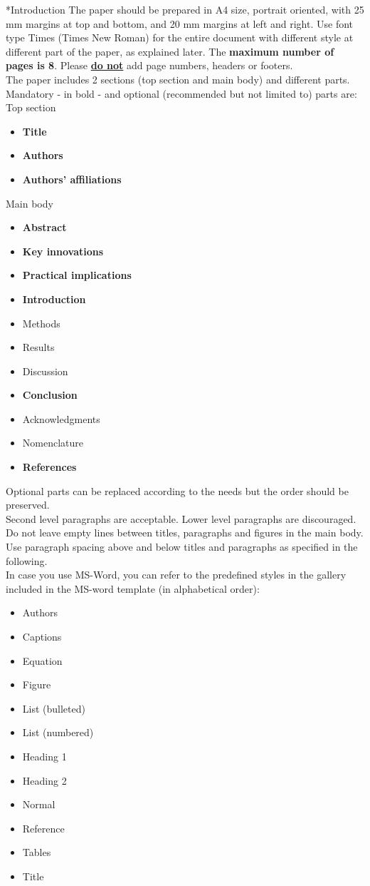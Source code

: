 \documentclass[twocolumn, a4paper,10pt]{article}
\makeatletter
\renewcommand\section{\@startsection{section}{1}{\z@}{3pt}{3pt}{\normalfont\large\bfseries}}
\makeatother
\begin{document}
\section*{Introduction}
The paper should be prepared in A4 size, portrait oriented, with 25 mm margins at top and bottom, and 20 mm margins at left and right. Use font type Times (Times New Roman) for the entire document with different style at different part of the paper, as explained later. The \textbf{maximum number of pages is 8}. Please \textbf{\underline{do not}} add page numbers, headers or footers.\\
The paper includes 2 sections (top section and main body) and different parts. Mandatory - in bold - and optional (recommended but not limited to) parts are:\\
Top section
\begin{itemize}
\item \textbf{Title}
\item \textbf{Authors}
\item \textbf{Authors' affiliations}
\end{itemize}
Main body
\begin{itemize}
\item \textbf{Abstract}
\item \textbf{Key innovations}
\item \textbf{Practical implications}
\item \textbf{Introduction}
\item Methods
\item Results
\item Discussion
\item \textbf{Conclusion}
\item Acknowledgments
\item Nomenclature
\item \textbf{References}
\end{itemize}
Optional parts can be replaced according to the needs but the order should be preserved.\\
Second level paragraphs are acceptable. Lower level paragraphs are discouraged.\\
Do not leave empty lines between titles, paragraphs and figures in the main body. Use paragraph spacing above and below titles and paragraphs as specified in the following. \\
In case you use MS-Word, you can refer to the predefined styles in the gallery included in the MS-word template (in alphabetical order):
\begin{itemize}
\item Authors
\item Captions
\item Equation
\item Figure
\item List (bulleted)
\item List (numbered)
\item Heading 1
\item Heading 2
\item Normal
\item Reference
\item Tables
\item Title
\end{itemize}
\end{document}
